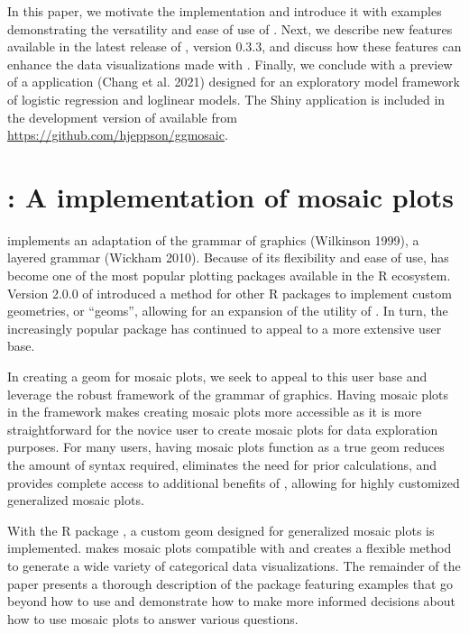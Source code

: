 In this paper, we motivate the  implementation and introduce it with examples demonstrating the versatility and ease of use of . Next, we describe new features available in the latest release of , version 0.3.3, and discuss how these features can enhance the data visualizations made with . Finally, we conclude with a preview of a  application (Chang et al. 2021) designed for an exploratory model framework of logistic regression and loglinear models. The Shiny application is included in the development version of  available from \url{https://github.com/hjeppson/ggmosaic}.

\hypertarget{a-implementation-of-mosaic-plots}{%
\section{\texorpdfstring{: A  implementation of mosaic plots}{: A  implementation of mosaic plots}}\label{a-implementation-of-mosaic-plots}}

 implements an adaptation of the grammar of graphics (Wilkinson 1999), a layered grammar (Wickham 2010). Because of its flexibility and ease of use,  has become one of the most popular plotting packages available in the R ecosystem. Version 2.0.0 of  introduced a method for other R packages to implement custom geometries, or ``geoms'', allowing for an expansion of the utility of . In turn, the increasingly popular package has continued to appeal to a more extensive user base.

In creating a  geom for mosaic plots, we seek to appeal to this user base and leverage the robust framework of the grammar of graphics. Having mosaic plots in the  framework makes creating mosaic plots more accessible as it is more straightforward for the novice user to create mosaic plots for data exploration purposes. For many users, having mosaic plots function as a true  geom reduces the amount of syntax required, eliminates the need for prior calculations, and provides complete access to additional benefits of , allowing for highly customized generalized mosaic plots.

With the R package , a custom  geom designed for generalized mosaic plots is implemented.  makes mosaic plots compatible with  and creates a flexible method to generate a wide variety of categorical data visualizations. The remainder of the paper presents a thorough description of the  package featuring examples that go beyond how to use  and demonstrate how to make more informed decisions about how to use mosaic plots to answer various questions.

